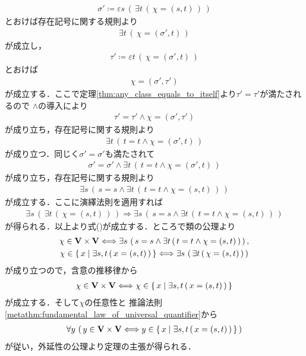 \begin{prf}
		\begin{align}
			\sigma' \coloneqq \varepsilon s\, \left(\, \exists t\, (\, \chi=(s,t)\, )\, \right)
		\end{align}
		とおけば存在記号に関する規則より
		\begin{align}
			\exists t\, (\, \chi=(\sigma',t)\, )
		\end{align}
		が成立し，
		\begin{align}
			\tau' \coloneqq \varepsilon t\, (\, \chi=(\sigma',t)\, )
		\end{align}
		とおけば
		\begin{align}
			\chi = (\sigma',\tau')
		\end{align}
		が成立する．ここで定理\ref{thm:any_class_equals_to_itself}より$\tau' = \tau'$が満たされるので
		$\wedge$の導入により
		\begin{align}
			\tau' = \tau' \wedge \chi = (\sigma',\tau')
		\end{align}
		が成り立ち，存在記号に関する規則より
		\begin{align}
			\exists t\, (\, t = t \wedge \chi = (\sigma',t)\, )
		\end{align}
		が成り立つ．同じく$\sigma' = \sigma'$も満たされて
		\begin{align}
			\sigma' = \sigma' \wedge \exists t\, (\, t = t \wedge \chi = (\sigma',t)\, )
		\end{align}
		が成り立ち，存在記号に関する規則より
		\begin{align}
			\exists s\, \left(\, s = s \wedge \exists t\, (\, t = t \wedge \chi = (s,t)\, )\, \right)
		\end{align}
		が成立する．ここに演繹法則を適用すれば
		\begin{align}
			\exists s\, \left(\, \exists t\, (\, \chi = (s,t)\, )\, \right)
			\Longrightarrow \exists s\, \left(\, s = s \wedge \exists t\, (\, t=t \wedge \chi=(s,t)\, )\, \right)
		\end{align}
		が得られる．以上より式()が成立する．ところで類の公理より
		\begin{align}
			\begin{gathered}
				\chi \in \mathbf{V} \times \mathbf{V} \Longleftrightarrow \exists s\, \left(\, s = s \wedge \exists t\, (\, t=t \wedge \chi=(s,t)\, )\, \right), \\
				\chi \in \left\{\, x \mid \exists s,t\, (\, x=(s,t)\, )\, \right\} \Longleftrightarrow
				\exists s\, \left(\, \exists t\, (\, \chi=(s,t)\, )\, \right)
			\end{gathered}
		\end{align}
		が成り立つので，含意の推移律から
		\begin{align}
			\chi \in \mathbf{V} \times \mathbf{V} \Longleftrightarrow \chi \in \left\{\, x \mid \exists s,t\, (\, x=(s,t)\, )\, \right\}
		\end{align}
		が成立する．そして$\chi$の任意性と
		推論法則\ref{metathm:fundamental_law_of_universal_quantifier}から
		\begin{align}
			\forall y\, \left(\, y \in \mathbf{V} \times \mathbf{V} \Longleftrightarrow y \in \left\{\, x \mid \exists s,t\, (\, x=(s,t)\, )\, \right\}\, \right)
		\end{align}
		が従い，外延性の公理より定理の主張が得られる．
		\QED
	\end{prf}
	
